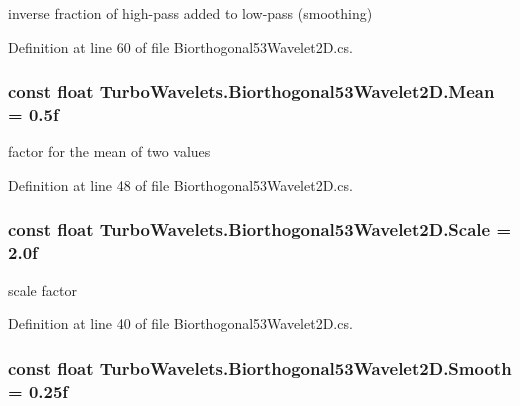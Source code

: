 inverse fraction of high-\/pass added to low-\/pass (smoothing) 



\-Definition at line 60 of file \-Biorthogonal53\-Wavelet2\-D.\-cs.

\hypertarget{class_turbo_wavelets_1_1_biorthogonal53_wavelet2_d_adc5fbcbea59e2154e77c9507cea584e2}{
\subsubsection[{\-Mean}]{\setlength{\rightskip}{0pt plus 5cm}const float {\bf \-Turbo\-Wavelets.\-Biorthogonal53\-Wavelet2\-D.\-Mean} = 0.\-5f}}\label{class_turbo_wavelets_1_1_biorthogonal53_wavelet2_d_adc5fbcbea59e2154e77c9507cea584e2}


factor for the mean of two values 



\-Definition at line 48 of file \-Biorthogonal53\-Wavelet2\-D.\-cs.

\hypertarget{class_turbo_wavelets_1_1_biorthogonal53_wavelet2_d_a18ab552c3e524a02a6115ac6ba9dc9dd}{
\subsubsection[{\-Scale}]{\setlength{\rightskip}{0pt plus 5cm}const float {\bf \-Turbo\-Wavelets.\-Biorthogonal53\-Wavelet2\-D.\-Scale} = 2.\-0f}}\label{class_turbo_wavelets_1_1_biorthogonal53_wavelet2_d_a18ab552c3e524a02a6115ac6ba9dc9dd}


scale factor 



\-Definition at line 40 of file \-Biorthogonal53\-Wavelet2\-D.\-cs.

\hypertarget{class_turbo_wavelets_1_1_biorthogonal53_wavelet2_d_af84189cc1bd640074755c2ce84041c93}{
\subsubsection[{\-Smooth}]{\setlength{\rightskip}{0pt plus 5cm}const float {\bf \-Turbo\-Wavelets.\-Biorthogonal53\-Wavelet2\-D.\-Smooth} = 0.\-25f}}\label{class_turbo_wavelets_1_1_biorthogonal53_wavelet2_d_af84189cc1bd640074755c2ce84041c93}


